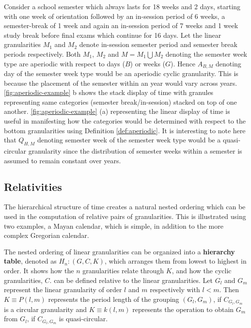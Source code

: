 \documentclass[12pt]{article}
\begin{document}
\begin{example}
{\rm Consider a school semester which always lasts for 18 weeks and 2 days, starting with one week of orientation followed by an in-session period of 6 weeks, a semester-break of 1 week and again an in-session period of 7 weeks and 1 week study break before final exams which continue for 16 days. Let the linear granularities $M_1$ and $M_2$ denote in-session semester period and semester break periods respectively. Both $M_1$, $M_2$ and $M = M_{1}\bigcup M_{2}$ denoting the semester week type are aperiodic with respect to days ($B$) or weeks ($G$). Hence $A_{B, M}$ denoting day of the semester week type would be an aperiodic cyclic granularity. This is because the placement of the semester within an year would vary across years. \autoref{fig:aperiodic-example} b shows the stack display of time with granules representing same categories (semester break/in-session) stacked on top of one another. \autoref{fig:aperiodic-example} (a) representing the linear display of time is useful in manifesting how the categories would be determined with respect to the bottom granularities using Definition \ref{def:aperiodic}. It is interesting to note here that $Q_{H, M}$ denoting semester week of the semester week type would be a quasi-circular granularity since the distribution of semester weeks within a semester is assumed to remain constant over years.}
\end{example}

\hypertarget{sec:cyclic-calendar}{%
\subsection{Relativities}\label{sec:cyclic-calendar}}

The hierarchical structure of time creates a natural nested ordering which can be used in the computation of relative pairs of granularities. This is illustrated using two examples, a Mayan calendar, which is simple, in addition to the more complex Gregorian calendar.

\begin{definition}\label{def:hierarchy} 
The nested ordering of linear granularities can be organized into a {\bf hierarchy table}, denoted as $H_n: (G, C, K)$, which arranges them from lowest to highest in order. It shows how the $n$ granularities relate through $K$, and how the cyclic granularities, $C$. can be defined relative to the linear granularities. Let $G_{l}$ and $G_{m}$ represent the linear granularity of order $l$ and $m$ respectively with $l<m$. Then $K \equiv P(l,m)$ represents the period length of the grouping $(G_{l}, G_{m})$, if $C_{G_{l}, G_{m}}$ is a circular granularity and $K \equiv k(l,m)$ represents the operation to obtain $G_{m}$ from $G_{l}$, if $C_{G_{l}, G_{m}}$ is quasi-circular.
\end{definition}
\end{document}

